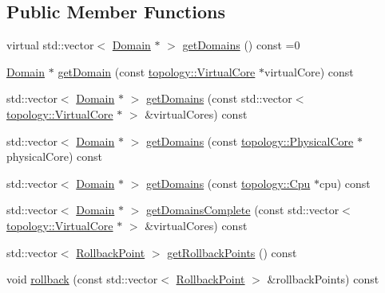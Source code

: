 \subsection*{Public Member Functions}
\begin{DoxyCompactItemize}
\item 
virtual std\-::vector$<$ \hyperlink{classmammut_1_1cpufreq_1_1Domain}{Domain} $\ast$ $>$ \hyperlink{classmammut_1_1cpufreq_1_1CpuFreq_a2ff7cb9b384f506f17340089bba3ba99}{get\-Domains} () const =0
\item 
\hyperlink{classmammut_1_1cpufreq_1_1Domain}{Domain} $\ast$ \hyperlink{classmammut_1_1cpufreq_1_1CpuFreq_a95c0e2150239fe11a9aefca56507e597}{get\-Domain} (const \hyperlink{classmammut_1_1topology_1_1VirtualCore}{topology\-::\-Virtual\-Core} $\ast$virtual\-Core) const 
\item 
std\-::vector$<$ \hyperlink{classmammut_1_1cpufreq_1_1Domain}{Domain} $\ast$ $>$ \hyperlink{classmammut_1_1cpufreq_1_1CpuFreq_a792caa6300834d6d556a1be168c2b347}{get\-Domains} (const std\-::vector$<$ \hyperlink{classmammut_1_1topology_1_1VirtualCore}{topology\-::\-Virtual\-Core} $\ast$ $>$ \&virtual\-Cores) const 
\item 
std\-::vector$<$ \hyperlink{classmammut_1_1cpufreq_1_1Domain}{Domain} $\ast$ $>$ \hyperlink{classmammut_1_1cpufreq_1_1CpuFreq_afe133f7b3462bcacf2e16e2e7d07d653}{get\-Domains} (const \hyperlink{classmammut_1_1topology_1_1PhysicalCore}{topology\-::\-Physical\-Core} $\ast$physical\-Core) const 
\item 
std\-::vector$<$ \hyperlink{classmammut_1_1cpufreq_1_1Domain}{Domain} $\ast$ $>$ \hyperlink{classmammut_1_1cpufreq_1_1CpuFreq_a744f346c67e10879a4d8d78d51ec44a1}{get\-Domains} (const \hyperlink{classmammut_1_1topology_1_1Cpu}{topology\-::\-Cpu} $\ast$cpu) const 
\item 
std\-::vector$<$ \hyperlink{classmammut_1_1cpufreq_1_1Domain}{Domain} $\ast$ $>$ \hyperlink{classmammut_1_1cpufreq_1_1CpuFreq_ad396bc3e3de6f008e929744347ce38d4}{get\-Domains\-Complete} (const std\-::vector$<$ \hyperlink{classmammut_1_1topology_1_1VirtualCore}{topology\-::\-Virtual\-Core} $\ast$ $>$ \&virtual\-Cores) const 
\item 
std\-::vector$<$ \hyperlink{structmammut_1_1cpufreq_1_1RollbackPoint}{Rollback\-Point} $>$ \hyperlink{classmammut_1_1cpufreq_1_1CpuFreq_a08e0675e8404b13d63c09a3fb28f005b}{get\-Rollback\-Points} () const 
\item 
void \hyperlink{classmammut_1_1cpufreq_1_1CpuFreq_ac60f3fe79742135c124746e9e357f277}{rollback} (const std\-::vector$<$ \hyperlink{structmammut_1_1cpufreq_1_1RollbackPoint}{Rollback\-Point} $>$ \&rollback\-Points) const 

\end{DoxyCompactItemize}
